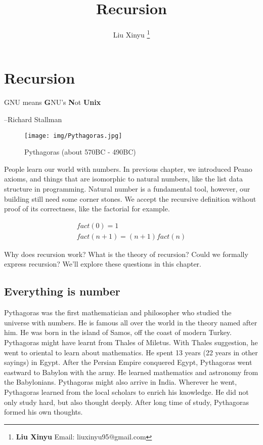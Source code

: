 \documentclass{article}
\begin{document}
\title{Recursion}

\author{Liu Xinyu
\thanks{{\bfseries Liu Xinyu} \newline
  Email: liuxinyu95@gmail.com}}

\maketitle
\fi


\ifx\wholebook\relax
\chapter{Recursion}
\fi

\epigraph{GNU means \textbf{G}NU's \textbf{N}ot \textbf{Unix}}{--Richard Stallman}

\begin{wrapfigure}{R}{0.3\textwidth}
 \centering
 \texttt{[image: img/Pythagoras.jpg]}
 \captionsetup{labelformat=empty}
 \caption{Pythagoras (about 570BC - 490BC)}
 \label{fig:Pythagoras}
\end{wrapfigure}

People learn our world with numbers. In previous chapter, we introduced Peano axioms, and things that are isomorphic to natural numbers, like the list data structure in programming. Natural number is a fundamental tool, however, our building still need some corner stones. We accept the recursive definition without proof of its correctness, like the factorial for example.

\[
\begin{array}{l}
\textit{fact}(0) = 1 \\
\textit{fact}(n + 1) = (n + 1) \textit{fact}(n)
\end{array}
\]

Why does recursion work? What is the theory of recursion? Could we formally express recursion? We'll explore these questions in this chapter.

\section{Everything is number}

Pythagoras was the first mathematician and philosopher who studied the universe with numbers. He is famous all over the world in the theory named after him. He was born in the island of Samos, off the coast of modern Turkey. Pythagoras might have learnt from Thales of Miletus. With Thales suggestion, he went to oriental to learn about mathematics. He spent 13 years (22 years in other sayings) in Egypt. After the Persian Empire conquered Egypt, Pythagoras went eastward to Babylon with the army. He learned mathematics and astronomy from the Babylonians. Pythagoras might also arrive in India. Wherever he went, Pythagoras learned from the local scholars to enrich his knowledge. He did not only study hard, but also thought deeply. After long time of study, Pythagoras formed his own thoughts\cite{HanXueTao16}.
\end{document}
